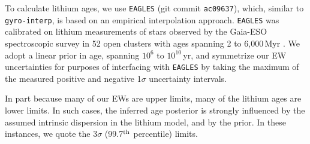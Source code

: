 \documentclass[11pt,twocolumn,tighten]{aastex63}
\newcommand{\nkeplerstars}{$\approx$160{,}000}
\begin{document}
To calculate lithium ages, we use \texttt{EAGLES} (git commit
\texttt{ac09637}), which, similar to \texttt{gyro-interp}, is based on
an empirical interpolation approach.  \texttt{EAGLES} 
was calibrated on lithium measurements of stars observed by the
Gaia-ESO spectroscopic survey in 52 open clusters with ages spanning 2
to 6{,}000\,Myr \citep{Jeffries_2023}.  We adopt a linear prior in
age, spanning $10^6$ to $10^{10}$\,yr, and symmetrize our EW
uncertainties for purposes of interfacing with \texttt{EAGLES} by
taking the maximum of the measured positive and negative 1$\sigma$
uncertainty intervals.

In part because many of our EWs are upper limits, many of the lithium
ages are lower limits.  In such cases,  the inferred age posterior is
strongly influenced by the assumed intrinsic dispersion in
the lithium model, and by the prior.  In these instances, we
quote the 3$\sigma$ (99.7$^{\rm th}$ percentile) limits.


%
%
%
\end{document}
